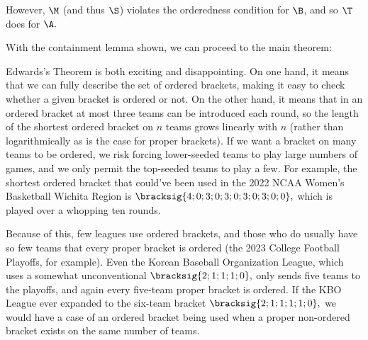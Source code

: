 {{    However, $\M$ (and thus $\S$) violates the orderedness condition for $\B$, and so $\T$ does for $\A.$ 
}{}

With the containment lemma shown, we can proceed to the main theorem:


Edwards's Theorem is both exciting and disappointing. On one hand, it means that we can fully describe the set of ordered brackets, making it easy to check whether a given bracket is ordered or not. On the other hand, it means that in an ordered bracket at most three teams can be introduced each round, so the length of the shortest ordered bracket on $n$ teams grows linearly with $n$ (rather than logarithmically as is the case for proper brackets). If we want a bracket on many teams to be ordered, we risk forcing lower-seeded teams to play large numbers of games, and we only permit the top-seeded teams to play a few. For example, the shortest ordered bracket that could've been used in the 2022 NCAA Women's Basketball Wichita Region is $\bracksig{4; 0; 3; 0; 3; 0; 3; 0; 3; 0; 0},$ which is played over a whopping ten rounds.


Because of this, few leagues use ordered brackets, and those who do usually have so few teams that every proper bracket is ordered (the 2023 College Football Playoffs, for example). Even the Korean Baseball Organization League, which uses a somewhat unconventional $\bracksig{2; 1; 1; 1; 0},$ only sends five teams to the playoffs, and again every five-team proper bracket is ordered. If the KBO League ever expanded to the six-team bracket $\bracksig{2; 1; 1; 1; 1; 0},$ we would have a case of an ordered bracket being used when a proper non-ordered bracket exists on the same number of teams.

}
